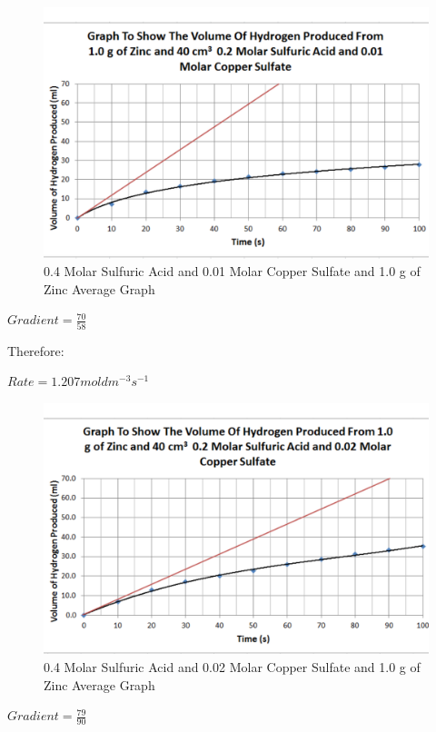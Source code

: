 \begin{figure}[H]
    \includegraphics[width=\textwidth]{./Analysis/Images/3VaryCopperSulfate/001Molar.pdf}
    \caption{0.4 Molar Sulfuric Acid and 0.01 Molar Copper Sulfate and 1.0 g of Zinc Average Graph} \label{fig:001VaryCopperSulfate}
\end{figure}

$Gradient = \frac{70}{58}$

Therefore:

$Rate = 1.207 mol dm^{-3} s^{-1}$

\begin{figure}[H]
    \includegraphics[width=\textwidth]{./Analysis/Images/3VaryCopperSulfate/002Molar.pdf}
    \caption{0.4 Molar Sulfuric Acid and 0.02 Molar Copper Sulfate and 1.0 g of Zinc Average Graph} \label{fig:002VaryCopperSulfate}
\end{figure}

$Gradient = \frac{79}{90}$

